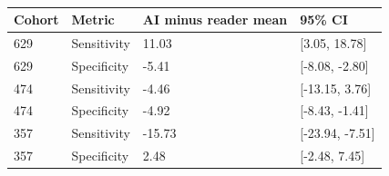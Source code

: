 \begin{table}[ht]
\centering
\caption{}
\label{tab:zw-paired-differences}
{\color{ZhixiangPink}\small
\begin{tabular}{llll}
\toprule
Cohort & Metric & AI minus reader mean & 95\% CI\\
\midrule
629 & Sensitivity & 11.03 & [3.05, 18.78]\\
629 & Specificity & -5.41 & [-8.08, -2.80]\\
474 & Sensitivity & -4.46 & [-13.15, 3.76]\\
474 & Specificity & -4.92 & [-8.43, -1.41]\\
357 & Sensitivity & -15.73 & [-23.94, -7.51]\\
357 & Specificity & 2.48 & [-2.48, 7.45]\\
\bottomrule
\end{tabular}}
\end{table}
